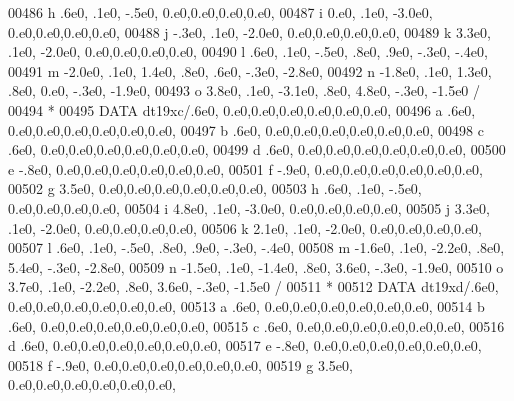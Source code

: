 \begin{DoxyCode}
00486      h            .6e0,   .1e0,  -.5e0,             0.e0,0.e0,0.e0,0.e0,
00487      i           0.e0,    .1e0, -3.0e0,             0.e0,0.e0,0.e0,0.e0,
00488      j           -.3e0,   .1e0, -2.0e0,             0.e0,0.e0,0.e0,0.e0,
00489      k           3.3e0,   .1e0, -2.0e0,             0.e0,0.e0,0.e0,0.e0,
00490      l            .6e0,   .1e0,  -.5e0,   .8e0,   .9e0,  -.3e0,  -.4e0,
00491      m          -2.0e0,   .1e0,  1.4e0,   .8e0,   .6e0,  -.3e0, -2.8e0,
00492      n          -1.8e0,   .1e0,  1.3e0,   .8e0,  0.e0,   -.3e0, -1.9e0,
00493      o           3.8e0,   .1e0, -3.1e0,   .8e0,  4.8e0,  -.3e0, -1.5e0 /
00494 \textcolor{comment}{*}
00495       \textcolor{keyword}{DATA} dt19xc/.6e0,                  0.e0,0.e0,0.e0,0.e0,0.e0,0.e0,
00496      a            .6e0,                  0.e0,0.e0,0.e0,0.e0,0.e0,0.e0,
00497      b            .6e0,                  0.e0,0.e0,0.e0,0.e0,0.e0,0.e0,
00498      c            .6e0,                  0.e0,0.e0,0.e0,0.e0,0.e0,0.e0,
00499      d            .6e0,                  0.e0,0.e0,0.e0,0.e0,0.e0,0.e0,
00500      e           -.8e0,                  0.e0,0.e0,0.e0,0.e0,0.e0,0.e0,
00501      f           -.9e0,                  0.e0,0.e0,0.e0,0.e0,0.e0,0.e0,
00502      g           3.5e0,                  0.e0,0.e0,0.e0,0.e0,0.e0,0.e0,
00503      h            .6e0,   .1e0,  -.5e0,             0.e0,0.e0,0.e0,0.e0,
00504      i           4.8e0,   .1e0, -3.0e0,             0.e0,0.e0,0.e0,0.e0,
00505      j           3.3e0,   .1e0, -2.0e0,             0.e0,0.e0,0.e0,0.e0,
00506      k           2.1e0,   .1e0, -2.0e0,             0.e0,0.e0,0.e0,0.e0,
00507      l            .6e0,   .1e0,  -.5e0,   .8e0,   .9e0,  -.3e0,  -.4e0,
00508      m          -1.6e0,   .1e0, -2.2e0,   .8e0,  5.4e0,  -.3e0, -2.8e0,
00509      n          -1.5e0,   .1e0, -1.4e0,   .8e0,  3.6e0,  -.3e0, -1.9e0,
00510      o           3.7e0,   .1e0, -2.2e0,   .8e0,  3.6e0,  -.3e0, -1.5e0 /
00511 \textcolor{comment}{*}
00512       \textcolor{keyword}{DATA} dt19xd/.6e0,                  0.e0,0.e0,0.e0,0.e0,0.e0,0.e0,
00513      a            .6e0,                  0.e0,0.e0,0.e0,0.e0,0.e0,0.e0,
00514      b            .6e0,                  0.e0,0.e0,0.e0,0.e0,0.e0,0.e0,
00515      c            .6e0,                  0.e0,0.e0,0.e0,0.e0,0.e0,0.e0,
00516      d            .6e0,                  0.e0,0.e0,0.e0,0.e0,0.e0,0.e0,
00517      e           -.8e0,                  0.e0,0.e0,0.e0,0.e0,0.e0,0.e0,
00518      f           -.9e0,                  0.e0,0.e0,0.e0,0.e0,0.e0,0.e0,
00519      g           3.5e0,                  0.e0,0.e0,0.e0,0.e0,0.e0,0.e0,

\end{DoxyCode}
